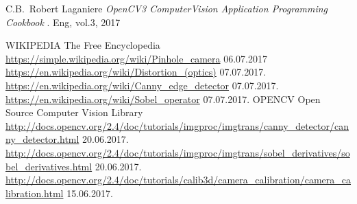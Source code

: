 \documentclass[journal,final,a4paper,twoside]{PS}
\begin{document}
\begin{thebibliography}{1}
C.B.~Robert Laganiere  \emph{OpenCV3 ComputerVision Application Programming Cookbook }. Eng, vol.3, 2017

WIKIPEDIA {The Free Encyclopedia}
\url{https://simple.wikipedia.org/wiki/Pinhole_camera} 06.07.2017\\
\url {https://en.wikipedia.org/wiki/Distortion_(optics)} 07.07.2017.\\
\url {https://en.wikipedia.org/wiki/Canny_edge_detector} 07.07.2017.\\
\url {https://en.wikipedia.org/wiki/Sobel_operator} 07.07.2017.
OPENCV {Open Source Computer Vision Library}
\url {http://docs.opencv.org/2.4/doc/tutorials/imgproc/imgtrans/canny_detector/canny_detector.html} 20.06.2017.\\
\url {http://docs.opencv.org/2.4/doc/tutorials/imgproc/imgtrans/sobel_derivatives/sobel_derivatives.html} 20.06.2017.\\
\url {http://docs.opencv.org/2.4/doc/tutorials/calib3d/camera_calibration/camera_calibration.html} 15.06.2017.\\

\end{thebibliography}
\end{document}
